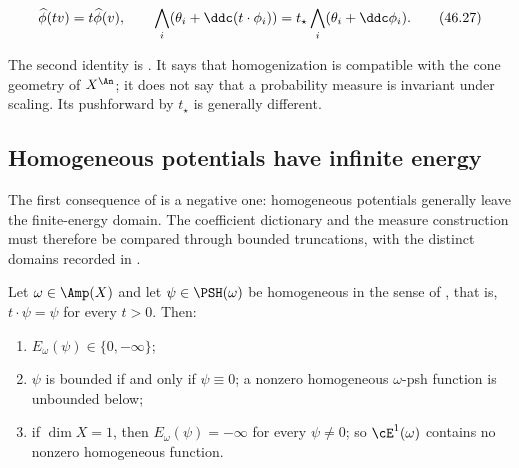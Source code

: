 \[
 \widehat\phi(t v)=t\widehat\phi(v),\qquad
 \bigwedge_i(\theta_i+\ddc(t\cdot\phi_i))
       =t_\star\bigwedge_i(\theta_i+\ddc\phi_i).
\tag{46.27}\label{eq:bj-homogeneous-ma-scaling}
\]

The second identity is \cite[Proposition~7.19(iii)]{BJ22}.  It says that
homogenization is compatible with the cone geometry of $X^{\An}$; it does
not say that a probability measure is invariant under scaling.  Its pushforward
by $t_\star$ is generally different.

\subsection{Homogeneous potentials have infinite energy}
\label{sec:ch46-homogeneous-energy}

The first consequence of  is a negative
one: homogeneous potentials generally leave the finite-energy domain.
The coefficient dictionary and the measure construction must therefore
be compared through bounded truncations, with the distinct domains
recorded in .

\begin{corollary}
\label{cor:ch46-homogeneous-infinite-energy}
Let $\omega\in\Amp(X)$ and let $\psi\in\PSH(\omega)$ be homogeneous
in the sense of , that is,
$t\cdot\psi=\psi$ for every $t>0$.  Then:
\begin{enumerate}
\item\label{itm:ch46-hom:dichotomy}
      $E_\omega(\psi)\in\{0,-\infty\}$;
\item\label{itm:ch46-hom:bounded}
      $\psi$ is bounded if and only if $\psi\equiv0$; a nonzero
      homogeneous $\omega$-psh function is unbounded below;
\item\label{itm:ch46-hom:curve}
      if $\dim X=1$, then $E_\omega(\psi)=-\infty$ for every
      $\psi\ne0$; so $\cE^1(\omega)$ contains no nonzero
      homogeneous function.
\end{enumerate}
\end{corollary}

